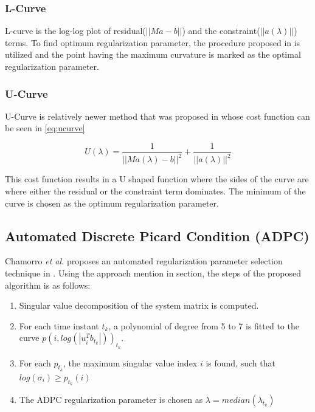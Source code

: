\documentclass[draftcls, onecolumn, journal]{IEEEtran}
\begin{document}
\newpage

\subsubsection{L-Curve}

L-curve is the log-log plot of residual($||Ma-b||$) and the constraint($||a(\lambda)||$) terms. To find optimum regularization parameter, the procedure proposed in \cite*{hansen1993use} is utilized and the point having the maximum curvature is marked as the optimal regularization parameter. 

\subsubsection{U-Curve}

U-Curve is relatively newer method that was proposed in \cite*{krawczyk2007regularization} whose cost function can be seen in \eqref{eq:ucurve}

\begin{equation}
    U(\lambda) = \frac{1}{||Ma(\lambda)-b||^2} + \frac{1}{||a(\lambda)||^2}
    \label{eq:ucurve}
\end{equation}

This cost function results in a U shaped function where the sides of the curve are where either the residual or the constraint term dominates. The minimum of the curve is chosen as the optimum regularization parameter. 

\subsection{Automated Discrete Picard Condition (ADPC)} \label{subsec:ADPC}

Chamorro \textit{et al.} proposes an automated regularization parameter selection technique in \cite*{chamorro2017improving}. Using the approach mention in  section, the steps of the proposed algorithm is as follows: 

\begin{enumerate}
    \item Singular value decomposition of the system matrix is computed.
    \item For each time instant $t_k$, a polynomial of degree from 5 to 7 is fitted to the curve $p(i,log(|u_i^Tb_{t_k}|))_{t_k}$.
    \item For each $p_{t_k}$, the maximum singular value index $i$ is found, such that $log(\sigma_i) \geq p_{t_k}(i)$
    \item The ADPC regularization parameter is chosen as $\lambda = median({\lambda_{t_k}})$
\end{enumerate}
\end{document}
